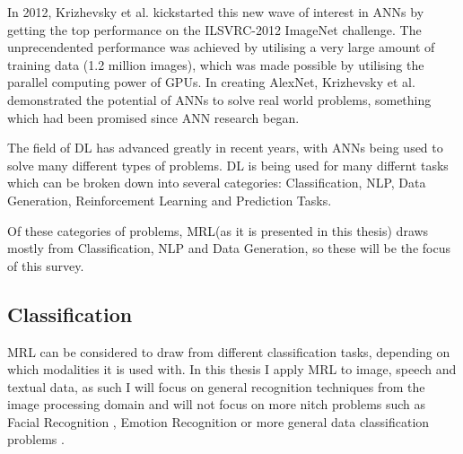 In 2012, Krizhevsky et al. \cite{krizhevsky2012imagenet} kickstarted this new wave of interest in \ac{ANN}s by getting the top performance on the ILSVRC-2012 ImageNet challenge. The unprecendented performance was achieved by utilising a very large amount of training data (1.2 million images), which was made possible by utilising the parallel computing power of \ac{GPU}s. In creating AlexNet, Krizhevsky et al. demonstrated the potential of \ac{ANN}s to solve real world problems, something which had been promised since \ac{ANN} research began.

The field of \ac{DL} has advanced greatly in recent years, with \ac{ANN}s being used to solve many different types of problems. DL is being used for many differnt tasks which can be broken down into several categories: Classification, \ac{NLP}, Data Generation, Reinforcement Learning and Prediction Tasks.


%   
%
%   
%   
%      

Of these categories of problems, \ac{MRL}(as it is presented in this thesis) draws mostly from Classification, \ac{NLP} and Data Generation, so these will be the focus of this survey.

\subsection{Classification}
\ac{MRL} can be considered to draw from different classification tasks, depending on which modalities it is used with. In this thesis I apply \ac{MRL} to image, speech and textual data, as such I will focus on general recognition techniques from the image processing domain and will not focus on more nitch problems such as Facial Recognition \cite{ma2004facial}, Emotion Recognition \cite{levi2015emotion} or more general data classification problems \cite{kussul2017deep,qi2017pointnet}.

